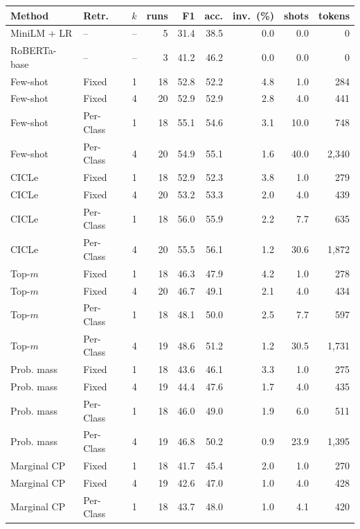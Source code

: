 \begin{tabular}{llrrrrrrr}
\toprule
Method & Retr. & $k$ & runs & F1 & acc. & inv.\ (\%) & shots & tokens \\
\midrule
MiniLM + LR & -- & -- & 5 & 31.4 & 38.5 & 0.0 & 0.0 & 0 \\
RoBERTa-base & -- & -- & 3 & 41.2 & 46.2 & 0.0 & 0.0 & 0 \\
\midrule
Few-shot & Fixed & 1 & 18 & 52.8 & 52.2 & 4.8 & 1.0 & 284 \\
Few-shot & Fixed & 4 & 20 & 52.9 & 52.9 & 2.8 & 4.0 & 441 \\
Few-shot & Per-Class & 1 & 18 & 55.1 & 54.6 & 3.1 & 10.0 & 748 \\
Few-shot & Per-Class & 4 & 20 & 54.9 & 55.1 & 1.6 & 40.0 & 2,340 \\
CICLe & Fixed & 1 & 18 & 52.9 & 52.3 & 3.8 & 1.0 & 279 \\
CICLe & Fixed & 4 & 20 & 53.2 & 53.3 & 2.0 & 4.0 & 439 \\
CICLe & Per-Class & 1 & 18 & 56.0 & 55.9 & 2.2 & 7.7 & 635 \\
CICLe & Per-Class & 4 & 20 & 55.5 & 56.1 & 1.2 & 30.6 & 1,872 \\
\midrule
Top-$m$ & Fixed & 1 & 18 & 46.3 & 47.9 & 4.2 & 1.0 & 278 \\
Top-$m$ & Fixed & 4 & 20 & 46.7 & 49.1 & 2.1 & 4.0 & 434 \\
Top-$m$ & Per-Class & 1 & 18 & 48.1 & 50.0 & 2.5 & 7.7 & 597 \\
Top-$m$ & Per-Class & 4 & 19 & 48.6 & 51.2 & 1.2 & 30.5 & 1,731 \\
Prob. mass & Fixed & 1 & 18 & 43.6 & 46.1 & 3.3 & 1.0 & 275 \\
Prob. mass & Fixed & 4 & 19 & 44.4 & 47.6 & 1.7 & 4.0 & 435 \\
Prob. mass & Per-Class & 1 & 18 & 46.0 & 49.0 & 1.9 & 6.0 & 511 \\
Prob. mass & Per-Class & 4 & 19 & 46.8 & 50.2 & 0.9 & 23.9 & 1,395 \\
Marginal CP & Fixed & 1 & 18 & 41.7 & 45.4 & 2.0 & 1.0 & 270 \\
Marginal CP & Fixed & 4 & 19 & 42.6 & 47.0 & 1.0 & 4.0 & 428 \\
Marginal CP & Per-Class & 1 & 18 & 43.7 & 48.0 & 1.0 & 4.1 & 420 \\

\end{tabular}
